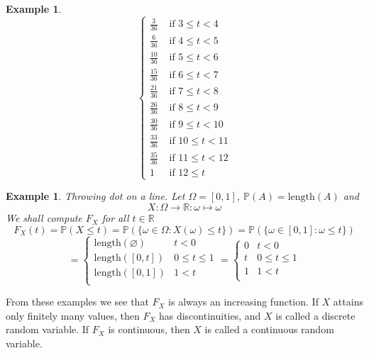 \documentclass[12pt]{article}
\newtheorem{example}[theorem]{Example}
\begin{document}
\begin{example}
$$\begin{cases}
            \frac{3}{36}  & \mbox { if } 3 \leq t < 4   \\
            \frac{6}{36}  & \mbox { if } 4 \leq t < 5   \\
            \frac{10}{36} & \mbox { if } 5 \leq t < 6   \\
            \frac{15}{36} & \mbox { if } 6 \leq t < 7   \\
            \frac{21}{36} & \mbox { if } 7 \leq t < 8   \\
            \frac{26}{36} & \mbox { if } 8 \leq t < 9   \\
            \frac{30}{36} & \mbox { if } 9 \leq t < 10  \\
            \frac{33}{36} & \mbox { if } 10 \leq t < 11 \\
            \frac{35}{36} & \mbox { if } 11 \leq t < 12 \\
            1             & \mbox { if }12 \leq t
        \end{cases}
    $$
\end{example}

\begin{example} Throwing dot on a line. Let $\Omega=[0,1]$,
    $\mathbb{P}(A)=\mbox{length}(A)$ and
    $$
        X:\Omega\to\mathbb{R}:\omega\mapsto \omega
    $$
    We shall compute $F_X$ for all $t\in\mathbb{R}$
    $$
        F_X(t)
        =\mathbb{P}(X\leq t)
        =\mathbb{P}(\{\omega\in\Omega:X(\omega)\leq t\})
        =\mathbb{P}(\{\omega\in[0,1]:\omega\leq t\})
    $$
    $$
        =\begin{cases}
            \mbox{length}(\varnothing) & t < 0          \\
            \mbox{length}([0,t])       & 0\leq t \leq 1 \\
            \mbox{length}([0,1])       & 1 < t          \\
        \end{cases}
        =\begin{cases}
            0 & t < 0          \\
            t & 0\leq t \leq 1 \\
            1 & 1 < t          \\
        \end{cases}
    $$
\end{example}

From these examples we see that $F_X$ is always an increasing function. If $X$
attains only finitely many values, then $F_X$ has discontinuities, and $X$ is
called a discrete random variable. If $F_X$ is continuous, then $X$ is called a
continuous random variable.
\end{document}
